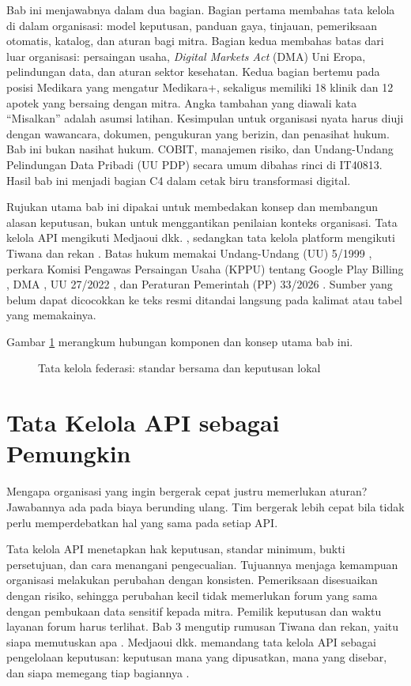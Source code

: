 Bab ini menjawabnya dalam dua bagian. Bagian pertama membahas tata kelola di dalam organisasi: model keputusan, panduan gaya,
tinjauan, pemeriksaan otomatis, katalog, dan aturan bagi mitra. Bagian kedua membahas batas dari luar organisasi: persaingan usaha,
\textit{Digital Markets Act} (DMA) Uni Eropa, pelindungan data, dan aturan sektor kesehatan. Kedua bagian bertemu pada posisi
Medikara yang mengatur Medikara+, sekaligus memiliki 18 klinik dan 12 apotek yang bersaing dengan mitra. Angka tambahan yang diawali
kata ``Misalkan'' adalah asumsi latihan. Kesimpulan untuk organisasi nyata harus diuji dengan wawancara, dokumen, pengukuran yang
berizin, dan penasihat hukum. Bab ini bukan nasihat hukum. COBIT, manajemen risiko, dan Undang-Undang Pelindungan Data Pribadi (UU PDP)
secara umum dibahas rinci di IT40813. Hasil bab ini menjadi bagian C4 dalam cetak biru transformasi digital.

Rujukan utama bab ini dipakai untuk membedakan konsep dan membangun alasan keputusan, bukan untuk menggantikan penilaian konteks
organisasi. Tata kelola API mengikuti Medjaoui dkk. \cite{medjaoui2021continuous}, sedangkan tata kelola platform mengikuti Tiwana dan
rekan \cite{tiwana2010platform, tiwana2014platform}. Batas hukum memakai Undang-Undang (UU) 5/1999 \cite{uu5-1999-persaingan},
perkara Komisi Pengawas Persaingan Usaha (KPPU) tentang Google Play Billing \cite{c13-kppu-google2025}, DMA \cite{eu-dma-2022}, UU 27/2022
\cite{uu27-2022-pdp}, dan Peraturan Pemerintah (PP) 33/2026 \cite{c13-pp33-2026}. Sumber yang belum dapat dicocokkan ke teks resmi ditandai
langsung pada kalimat atau tabel yang memakainya.

Gambar \ref{fig:ch13-ilustrasi-bab} merangkum hubungan komponen dan konsep utama bab ini.
\begin{figure}[!htb]
  \centering
  
  \caption{Tata kelola federasi: standar bersama dan keputusan lokal}
  \label{fig:ch13-ilustrasi-bab}
\end{figure}

\section{Tata Kelola API sebagai Pemungkin}

Mengapa organisasi yang ingin bergerak cepat justru memerlukan aturan? Jawabannya ada pada biaya berunding ulang. Tim bergerak lebih
cepat bila tidak perlu memperdebatkan hal yang sama pada setiap API.

Tata kelola API menetapkan hak keputusan, standar minimum, bukti persetujuan, dan cara menangani pengecualian. Tujuannya menjaga
kemampuan organisasi melakukan perubahan dengan konsisten. Pemeriksaan disesuaikan dengan risiko, sehingga perubahan kecil tidak
memerlukan forum yang sama dengan pembukaan data sensitif kepada mitra. Pemilik keputusan dan waktu layanan forum harus terlihat. Bab
3 mengutip rumusan Tiwana dan rekan, yaitu siapa memutuskan apa \cite{tiwana2010platform}. Medjaoui dkk. memandang tata kelola API
sebagai pengelolaan keputusan: keputusan mana yang dipusatkan, mana yang disebar, dan siapa memegang tiap bagiannya
\cite{medjaoui2021continuous}.

